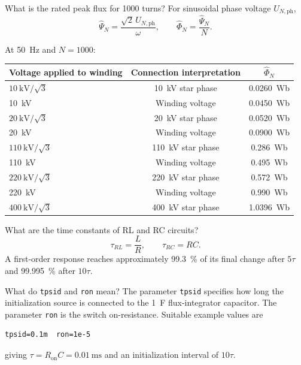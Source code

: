 \begin{formulaBox}{What is the rated peak flux for 1000 turns?}
For sinusoidal phase voltage $U_{N,\mathrm{ph}}$,
\begin{equation}
\widehat\Psi_N=\frac{\sqrt{2}\,U_{N,\mathrm{ph}}}{\omega},
\qquad
\widehat\Phi_N=\frac{\widehat\Psi_N}{N}.
\end{equation}

At \SI{50}{\hertz} and $N=1000$:
\begin{table}[H]
\centering
\renewcommand{\arraystretch}{1.12}
\begin{tabular}{lcc}
\toprule
Voltage applied to winding & Connection interpretation & $\widehat\Phi_N$ \\
\midrule
\(\SI{10}{\kilo\volt}/\sqrt{3}\) & \SI{10}{\kilo\volt} star phase & \SI{0.0260}{\weber} \\
\SI{10}{\kilo\volt} & Winding voltage & \SI{0.0450}{\weber} \\
\(\SI{20}{\kilo\volt}/\sqrt{3}\) & \SI{20}{\kilo\volt} star phase & \SI{0.0520}{\weber} \\
\SI{20}{\kilo\volt} & Winding voltage & \SI{0.0900}{\weber} \\
\(\SI{110}{\kilo\volt}/\sqrt{3}\) & \SI{110}{\kilo\volt} star phase & \SI{0.286}{\weber} \\
\SI{110}{\kilo\volt} & Winding voltage & \SI{0.495}{\weber} \\
\(\SI{220}{\kilo\volt}/\sqrt{3}\) & \SI{220}{\kilo\volt} star phase & \SI{0.572}{\weber} \\
\SI{220}{\kilo\volt} & Winding voltage & \SI{0.990}{\weber} \\
\(\SI{400}{\kilo\volt}/\sqrt{3}\) & \SI{400}{\kilo\volt} star phase & \SI{1.0396}{\weber} \\
\bottomrule
\end{tabular}
\end{table}
\end{formulaBox}

\begin{formulaBox}{What are the time constants of RL and RC circuits?}
\begin{equation}
\tau_{RL}=\frac{L}{R},
\qquad
\tau_{RC}=RC.
\end{equation}
A first-order response reaches approximately \SI{99.3}{\percent} of its final
change after $5\tau$ and \SI{99.995}{\percent} after $10\tau$.
\end{formulaBox}

\begin{formulaBox}{What do \texttt{tpsid} and \texttt{ron} mean?}
The parameter \texttt{tpsid} specifies how long the initialization source is
connected to the \SI{1}{\farad} flux-integrator capacitor. The parameter
\texttt{ron} is the switch on-resistance. Suitable example values are
\begin{lstlisting}[style=LTspice]
tpsid=0.1m  ron=1e-5
\end{lstlisting}
giving $\tau=R_{\mathrm{on}}C=\SI{0.01}{\milli\second}$ and an initialization
interval of $10\tau$.
\end{formulaBox}


